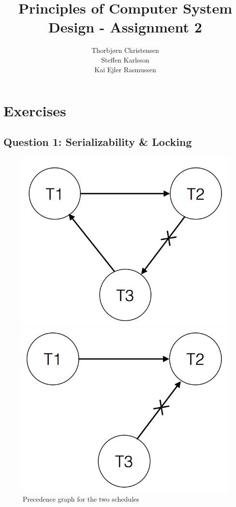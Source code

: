 \documentclass[10pt,a4paper]{article}
\author{Thorbjørn Christensen \\
Steffen Karlsson \\
Kai Ejler Rasmussen}
\title{Principles of Computer System Design - Assignment 2}
\begin{document}
\maketitle

\section*{Exercises}
\subsection*{Question 1: Serializability \& Locking}
\begin{figure}[ht]
\begin{minipage}[b]{0.50\linewidth}
\centering
\includegraphics[width=\textwidth]{schedule1.png}
\end{minipage}
\hspace{0.5cm}
\begin{minipage}[b]{0.50\linewidth}
\centering
\includegraphics[width=\textwidth]{schedule2.png}
\end{minipage}
\caption{Precedence graph for the two schedules \label{fig:precedence-graph}}
\end{figure}
\end{document}
